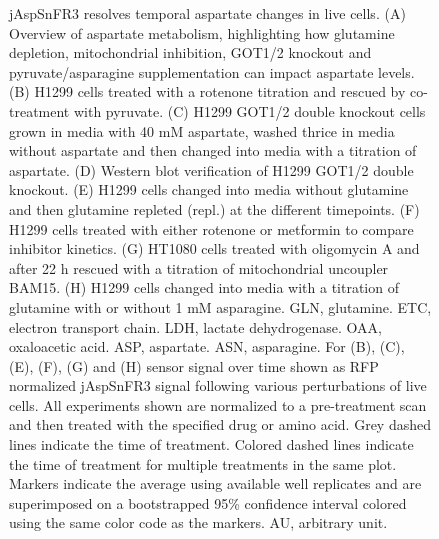 \documentclass[9pt,lineno]{elife}
\begin{document}
\begin{figure}[ht!]
\ContinuedFloat
\caption{
jAspSnFR3 resolves temporal aspartate changes in live cells.
(A) Overview of aspartate metabolism, highlighting how glutamine depletion, mitochondrial inhibition, GOT1/2 knockout and pyruvate/asparagine supplementation can impact aspartate levels.
(B) H1299 cells treated with a rotenone titration and rescued by co-treatment with pyruvate.
(C) H1299 GOT1/2 double knockout cells grown in media with 40 mM aspartate, washed thrice in media without aspartate and then changed into media with a titration of aspartate.
(D) Western blot verification of H1299 GOT1/2 double knockout.
(E) H1299 cells changed into media without glutamine and then glutamine repleted (repl.) at the different timepoints.
(F) H1299 cells treated with either rotenone or metformin to compare inhibitor kinetics.
(G) HT1080 cells treated with oligomycin A and after 22 h rescued with a titration of mitochondrial uncoupler BAM15.
(H) H1299 cells changed into media with a titration of glutamine with or without 1 mM asparagine.
GLN, glutamine.
ETC, electron transport chain.
LDH, lactate dehydrogenase.
OAA, oxaloacetic acid.
ASP, aspartate.
ASN, asparagine.
For (B), (C), (E), (F), (G) and (H) sensor signal over time shown as RFP normalized jAspSnFR3 signal following various perturbations of live cells.
All experiments shown are normalized to a pre-treatment scan and then treated with the specified drug or amino acid.
Grey dashed lines indicate the time of treatment.
Colored dashed lines indicate the time of treatment for multiple treatments in the same plot.
Markers indicate the average using available well replicates and are superimposed on a bootstrapped 95\% confidence interval colored using the same color code as the markers.
AU, arbitrary unit.
}
\label{fig:Fig2}
\end{figure}
\end{document}
